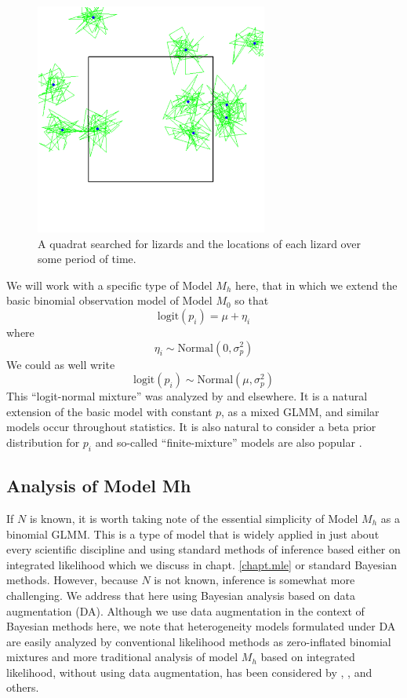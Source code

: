 \begin{figure}
\begin{center}
\includegraphics[height=3in]{figs/quadrat}
\end{center}
\caption{A quadrat searched for lizards and the locations of each
  lizard over some period of time.}
\label{closed.fig.quadrat}
\end{figure}

We will work with a specific type of Model $M_{h}$ here, that in which
we extend the basic binomial observation model of Model $M_{0}$ so
that
\[
\mbox{logit}(p_{i}) = \mu + \eta_{i}  
\]
where 
\[
\eta_{i} \sim \mbox{Normal}(0, \sigma_{p}^2)
\]
We could as well write
\[
\mbox{logit}(p_{i}) \sim \mbox{Normal}(\mu,\sigma_{p}^2)
\]
This ``logit-normal mixture'' was analyzed by
\citet{coull_agresti:1999} and elsewhere. It is a natural extension of
the basic model with constant $p$, as a mixed GLMM, and similar models
occur throughout statistics. It is also natural to consider a beta
prior distribution for $p_{i}$ \citep{dorazio_royle:2003} and
so-called ``finite-mixture'' models are also popular
\citep{norris_pollock:1996, pledger:2000}.

\subsection{Analysis of Model Mh}

If $N$ is known, it is worth taking note of the essential simplicity
of Model $M_h$ as a binomial GLMM.  This is a type of model that is
widely applied in just about every scientific discipline and using
standard methods of inference based either on integrated likelihood
\citep{laird_ware:1982, berger_etal:1999} which we discuss in
chapt. \ref{chapt.mle} or standard Bayesian
methods. However, because $N$ is not known, inference is somewhat more
challenging. We address that here using Bayesian analysis based on
data augmentation (DA). Although we use data augmentation in the context of
Bayesian methods here, we note that
heterogeneity models formulated under DA are easily analyzed by
conventional likelihood methods as zero-inflated binomial mixtures
\citep{royle:2006} and more traditional analysis of model $M_h$ based on
integrated likelihood, without using data augmentation, has been
considered by \citet{coull_agresti:1999}, \citet{dorazio_royle:2003},
and others.


